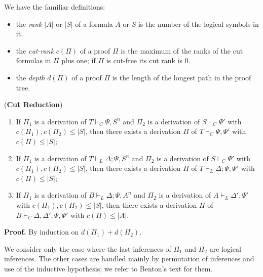 We have the familiar definitions: 
\begin{itemize}
\item the \emph{rank} $|A|$ or $|S|$ of a formula $A$ or $S$ is the number of the logical symbols in it.
\item the \emph{cut-rank} $c(\Pi)$ of a proof $\Pi$ is the maximum of the ranks of the cut formulas in $\Pi$ plus one; 
if $\Pi$ is cut-free its cut rank is 0.
\item the \emph{depth} $d(\Pi)$ of a proof $\Pi$ is the length of the longest path in the proof tree.
\end{itemize}
\begin{lemma}
\end{lemma} ({\bf Cut Reduction}) 
\begin{enumerate}
\item If $\Pi_1$ is a derivation of $T \vdash_C \Psi, S^n$ and  $\Pi_2$ is a derivation of $S \vdash_C\Psi'$ with 
$c(\Pi_1), c(\Pi_2) \leq |S|$, then there exists a derivation $\Pi$ of $T\vdash_C \Psi, \Psi'$ with $c(\Pi) \leq |S|$;
\item If $\Pi_1$ is a derivation of $T \vdash_L \Delta; \Psi, S^n$ and  $\Pi_2$ is a derivation of $S \vdash_C\Psi'$ with 
$c(\Pi_1), c(\Pi_2) \leq |S|$, then there exists a derivation $\Pi$ of $T\vdash_L \Delta; \Psi, \Psi'$ with $c(\Pi) \leq |S|$;
\item If $\Pi_1$ is a derivation of $B\vdash_L \Delta; \Psi, A^n$ and  $\Pi_2$ is a derivation of $A \vdash_L\Delta', \Psi'$ with $c(\Pi_1), c(\Pi_2) \leq |S|$, then there exists a derivation $\Pi$ of $B\vdash_C\Delta, \Delta', \Psi, \Psi'$ with $c(\Pi) \leq |A|$.
\end{enumerate}

\noindent
{\bf Proof.} By induction on $d(\Pi_1) + d(\Pi_2)$. 

\noindent
We consider only the case where the last inferences of $\Pi_1$ and $\Pi_2$ are logical inferences. The other cases 
are handled mainly by permutation of inferences and use of the inductive hypothesis; we refer to Benton's text for them.

\vspace{1ex}

